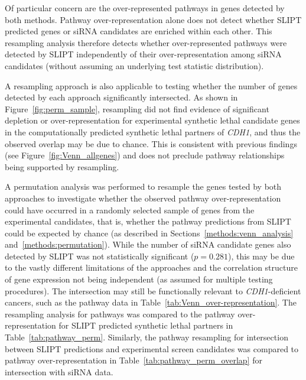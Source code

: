 Of particular concern are the over-represented pathways in genes detected by both methods. Pathway over-representation alone does not detect whether \gls{SLIPT} predicted genes or siRNA candidates are enriched within each other. This resampling analysis therefore detects whether over-represented pathways were detected by \gls{SLIPT} independently of their over-representation among siRNA candidates (without assuming an underlying test statistic distribution).

A resampling approach is also applicable to testing whether the number of genes detected by each approach significantly intersected. As shown in Figure~\ref{fig:perm_sample}, resampling did not find evidence of significant depletion or over-represent\-ation for experimental synthetic lethal candidate genes in the computationally predicted synthetic lethal partners of \textit{CDH1}, and thus the observed overlap may be due to chance. This is consistent with previous findings (see Figure~\ref{fig:Venn_allgenes}) and does not preclude pathway relationships being supported by resampling.

A permutation analysis was performed to resample the genes tested by both approaches to investigate whether the observed pathway over-represent\-ation could have occurred in a randomly selected sample of genes from the experimental candidates, that is, whether the pathway predictions from \gls{SLIPT} could be expected by chance (as described in Sections~\ref{methods:venn_analysis} and~\ref{methods:permutation}).
While the number of \gls{siRNA} candidate genes also detected by \gls{SLIPT} was not statistically significant ($p=0.281$), this may be due to the vastly different limitations of the approaches and the correlation structure of gene expression not being independent (as assumed for multiple testing procedures). The  intersection may still be functionally relevant to \textit{CDH1}-deficient cancers, such as the pathway data in Table~\ref{tab:Venn_over-representation}. The resampling analysis for pathways was compared to the pathway over-represent\-ation for \gls{SLIPT} predicted synthetic lethal partners in Table~\ref{tab:pathway_perm}. Similarly, the pathway resampling for intersection between \gls{SLIPT} predictions and experimental screen candidates was compared to pathway over-represent\-ation in Table~\ref{tab:pathway_perm_overlap} for intersection with siRNA data.

